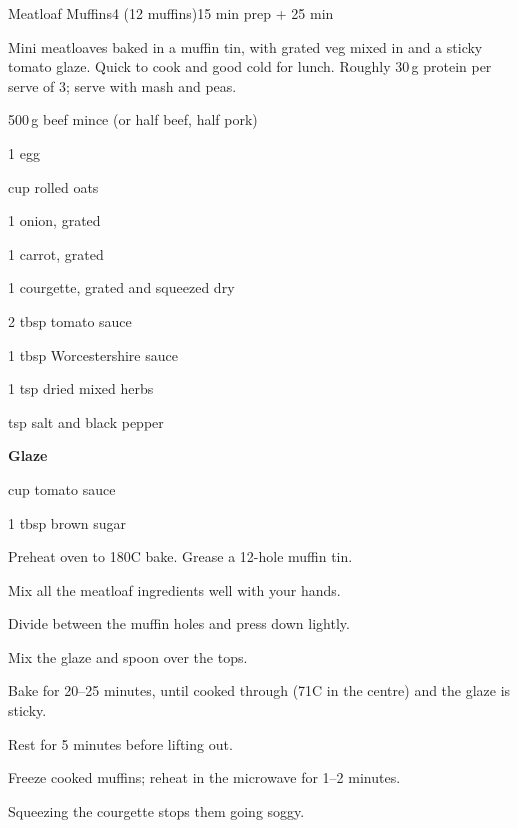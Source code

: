 \begin{recipebox}{Meatloaf Muffins}{4 (12 muffins)}{15 min prep + 25 min}

Mini meatloaves baked in a muffin tin, with grated veg mixed in and a sticky
tomato glaze. Quick to cook and good cold for lunch. Roughly 30\,g protein
per serve of 3; serve with mash and peas.

\begin{ingredients}
  \item 500\,g beef mince (or half beef, half pork)
  \item 1 egg
  \item {} cup rolled oats
  \item 1 onion, grated
  \item 1 carrot, grated
  \item 1 courgette, grated and squeezed dry
  \item 2 tbsp tomato sauce
  \item 1 tbsp Worcestershire sauce
  \item 1 tsp dried mixed herbs
  \item {} tsp salt and black pepper
  \item[] \textbf{Glaze}
  \item {} cup tomato sauce
  \item 1 tbsp brown sugar
\end{ingredients}

\begin{method}
  \item Preheat oven to 180\degree C bake. Grease a 12-hole muffin tin.
  \item Mix all the meatloaf ingredients well with your hands.
  \item Divide between the muffin holes and press down lightly.
  \item Mix the glaze and spoon over the tops.
  \item Bake for 20--25 minutes, until cooked through (71\degree C in the centre) and the glaze is sticky.
  \item Rest for 5 minutes before lifting out.
\end{method}

\begin{notelist}
  \item Freeze cooked muffins; reheat in the microwave for 1--2 minutes.
  \item Squeezing the courgette stops them going soggy.
\end{notelist}

\end{recipebox}
